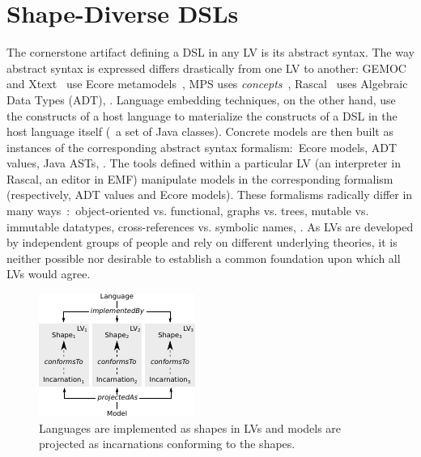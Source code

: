 \section{Shape-Diverse DSLs}
\label{sec:shapes}

The cornerstone artifact defining a DSL in any LV is its abstract syntax.
The way abstract syntax is expressed differs drastically from one LV to another: GEMOC~\cite{bousse2016execution} and Xtext~\cite{bettini2016implementing} use Ecore metamodels~\cite{steinberg2008emf}, MPS uses \emph{concepts}~\cite{voelter2014generic}, Rascal~\cite{klint2010easy} uses Algebraic Data Types (ADT), \etc.
Language embedding techniques, on the other hand, use the constructs of a host language to materialize the constructs of a DSL in the host language itself (\eg~a set of Java classes).
Concrete models are then built as instances of the corresponding abstract syntax formalism:~Ecore models, ADT values, Java ASTs, \etc.
The tools defined within a particular LV (an interpreter in Rascal, an editor in EMF) manipulate models in the corresponding formalism (respectively, ADT values and Ecore models).
These formalisms radically differ in many ways~\cite{klint2016model}:~object-oriented vs. functional, graphs vs. trees, mutable vs. immutable datatypes, cross-references vs. symbolic names, \etc.
As LVs are developed by independent groups of people and rely on different underlying theories, it is neither possible nor desirable to establish a common foundation upon which all LVs would agree.

\begin{figure}[bt]
	\centering
	\includegraphics[width=.7\columnwidth]{figures/shape-diverse-lang-3}
	\caption{Languages are implemented as shapes in LVs and models are projected as incarnations conforming to the shapes.}
	\label{fig:concepts}
\end{figure}


